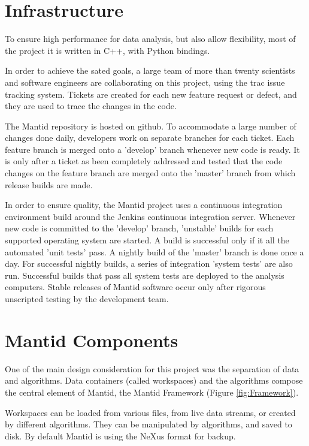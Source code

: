 \documentclass{elsarticle}
\begin{document}
\section{Infrastructure}
\label{infrastructure}
To ensure high performance for data analysis, but also allow flexibility, most of the project it is written in C++, with Python bindings.
 
In order to achieve the sated goals, a large team of more than twenty scientists and software engineers are collaborating on this project, using the trac issue tracking system. Tickets are created for each new feature request or defect, and they are used to trace the changes in the code.

The Mantid repository is hosted on github. To accommodate a large number of changes done daily, developers work on separate branches for each ticket. Each feature branch is merged onto a 'develop' branch whenever new code is ready.
It is only after a ticket as been completely addressed and tested that the code changes on the feature branch are merged onto the 'master' branch from which release builds are made.

In order to ensure quality, the Mantid project uses a continuous integration environment build around the Jenkins continuous integration server. Whenever new code is committed to the 'develop' branch, 'unstable' builds for each supported operating system are started. A build is successful only if it all the automated 'unit tests' pass. A nightly build of the 'master' branch is done once a day. For successful nightly builds, a series of integration 'system tests' are also run. Successful builds that pass all system tests are deployed to the analysis computers. Stable releases of Mantid software occur only after rigorous unscripted testing by the development team.  



\section{Mantid Components}
One of the main design consideration for this project was the separation of data and algorithms. Data containers (called workspaces) and the algorithms compose the central element of Mantid, the Mantid Framework (Figure \ref{fig:Framework}). 

Workspaces can be loaded from various files, from live data streams, or created by different algorithms. They can be manipulated by algorithms, and saved to disk. By default Mantid is using the NeXus format for backup.
\end{document}
